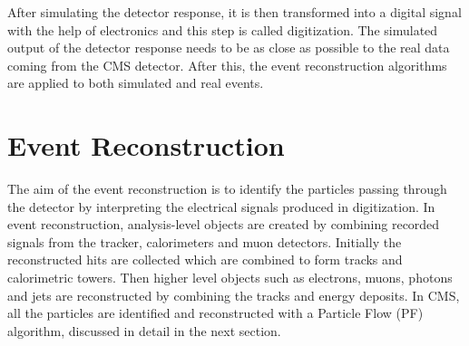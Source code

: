 After simulating the detector response, it is then transformed into a digital signal with the help of electronics and this step is called digitization. The simulated output of the detector response needs to be as close as possible to the real data coming from the CMS detector. After this, the event reconstruction algorithms are applied to both simulated and real events.
\section{Event Reconstruction}
The aim of the event reconstruction is to identify the particles passing through the detector by interpreting the electrical signals produced in digitization. In event reconstruction, analysis-level objects are created by combining recorded signals from the tracker, calorimeters and muon detectors. Initially the reconstructed hits are collected which are combined to form tracks and calorimetric towers. Then higher level objects such as electrons, muons, photons and jets are reconstructed by combining the tracks and energy deposits. In CMS, all the particles are identified and reconstructed with a Particle Flow (PF) algorithm, discussed in detail in the next section.

